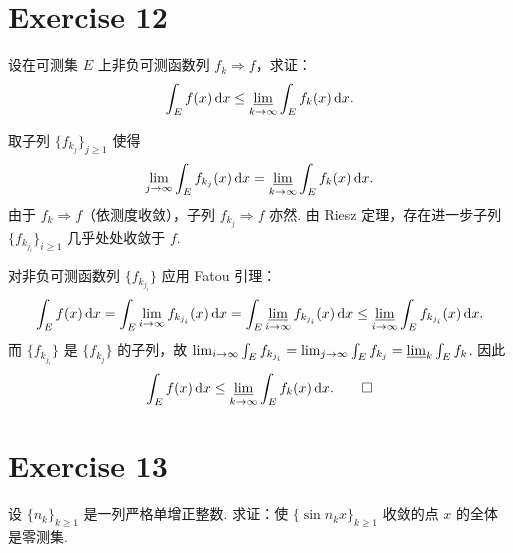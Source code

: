 \documentclass{article}
\begin{document}
\section{Exercise 12}

设在可测集 $E$ 上非负可测函数列 $f_k \Rightarrow f$，求证：
\[
  \int_E f(x)\,\mathrm{d} x \le \varliminf_{k \to \infty} \int_E f_k(x)\,\mathrm{d} x.
\]

\begin{solution}
  取子列 $\{f_{k_j}\}_{j \ge 1}$ 使得
  \[
    \lim_{j\to\infty} \int_E f_{k_j}(x)\,\mathrm{d} x = \varliminf_{k\to\infty} \int_E f_k(x)\,\mathrm{d} x.
  \]
  由于 $f_k \Rightarrow f$（依测度收敛），子列 $f_{k_j} \Rightarrow f$ 亦然.
  由 Riesz 定理，存在进一步子列 $\{f_{k_{j_i}}\}_{i \ge 1}$ 几乎处处收敛于 $f$.

  对非负可测函数列 $\{f_{k_{j_i}}\}$ 应用 Fatou 引理：
  \[
    \int_E f(x)\,\mathrm{d} x
    = \int_E \lim_{i\to\infty} f_{k_{j_i}}(x)\,\mathrm{d} x
    = \int_E \varliminf_{i\to\infty} f_{k_{j_i}}(x)\,\mathrm{d} x
    \le \varliminf_{i\to\infty} \int_E f_{k_{j_i}}(x)\,\mathrm{d} x.
  \]
  而 $\{f_{k_{j_i}}\}$ 是 $\{f_{k_j}\}$ 的子列，故
  $\lim_{i\to\infty} \int_E f_{k_{j_i}} = \lim_{j\to\infty} \int_E f_{k_j} = \varliminf_k \int_E f_k$.
  因此
  \[
    \int_E f(x)\,\mathrm{d} x \le \varliminf_{k\to\infty} \int_E f_k(x)\,\mathrm{d} x. \qed
  \]
\end{solution}

\section{Exercise 13}

设 $\{n_k\}_{k \ge 1}$ 是一列严格单增正整数. 求证：使 $\{\sin n_k x\}_{k \ge 1}$ 收敛的点 $x$ 的全体是零测集.
\end{document}
